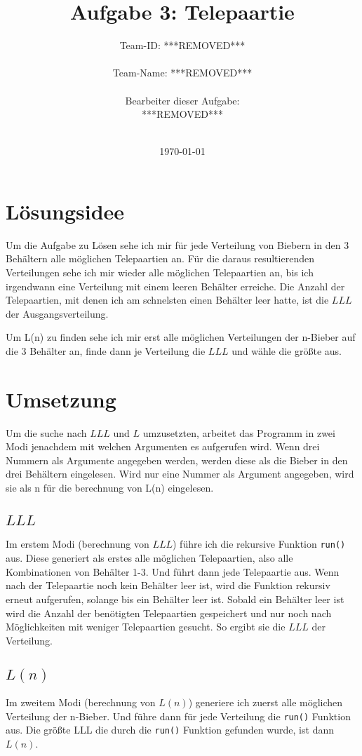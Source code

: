 \documentclass[a4paper,10pt]{scrartcl}
\title{Aufgabe 3: Telepaartie}
\author{Team-ID: ***REMOVED*** \\\\
	    Team-Name: ***REMOVED*** \\\\
	    Bearbeiter dieser Aufgabe: \\
	    ***REMOVED***\\\\}
\date{\today}
\begin{document}
\maketitle
\tableofcontents

\section{Lösungsidee}
Um die Aufgabe zu Lösen sehe ich mir für jede Verteilung von Biebern in den 3 Behältern alle möglichen Telepaartien an. Für die daraus resultierenden Verteilungen sehe ich mir wieder alle möglichen Telepaartien an, bis ich irgendwann eine Verteilung mit einem leeren Behälter erreiche. Die Anzahl der Telepaartien, mit denen ich am schnelsten einen Behälter leer hatte, ist die \(LLL\) der Ausgangsverteilung.

Um L(n) zu finden sehe ich mir erst alle möglichen Verteilungen der n-Bieber auf die 3 Behälter an, finde dann je Verteilung die \(LLL\) und wähle die größte aus.

\section{Umsetzung}
Um die suche nach \(LLL\) und \(L\) umzusetzten, arbeitet das Programm in zwei Modi jenachdem mit welchen Argumenten es aufgerufen wird. Wenn drei Nummern als Argumente angegeben werden, werden diese als die Bieber in den drei Behältern eingelesen. Wird nur eine Nummer als Argument angegeben, wird sie als n für die berechnung von L(n) eingelesen.

\subsection{\(LLL\)}
Im erstem Modi (berechnung von \(LLL\)) führe ich die rekursive Funktion \lstinline|run()| aus. Diese generiert als erstes alle möglichen Telepaartien, also alle Kombinationen von Behälter 1-3. Und führt dann jede Telepaartie aus. Wenn nach der Telepaartie noch kein Behälter leer ist, wird die Funktion rekursiv erneut aufgerufen, solange bis ein Behälter leer ist. Sobald ein Behälter leer ist wird die Anzahl der benötigten Telepaartien gespeichert und nur noch nach Möglichkeiten mit weniger Telepaartien gesucht. So ergibt sie die \(LLL\) der Verteilung.

\subsection{\(L(n)\)}
Im zweitem Modi (berechnung von \(L(n)\)) generiere ich zuerst alle möglichen Verteilung der n-Bieber. Und führe dann für jede Verteilung die \lstinline|run()| Funktion aus. Die größte LLL die durch die \lstinline|run()| Funktion gefunden wurde, ist dann \(L(n)\).
\end{document}
